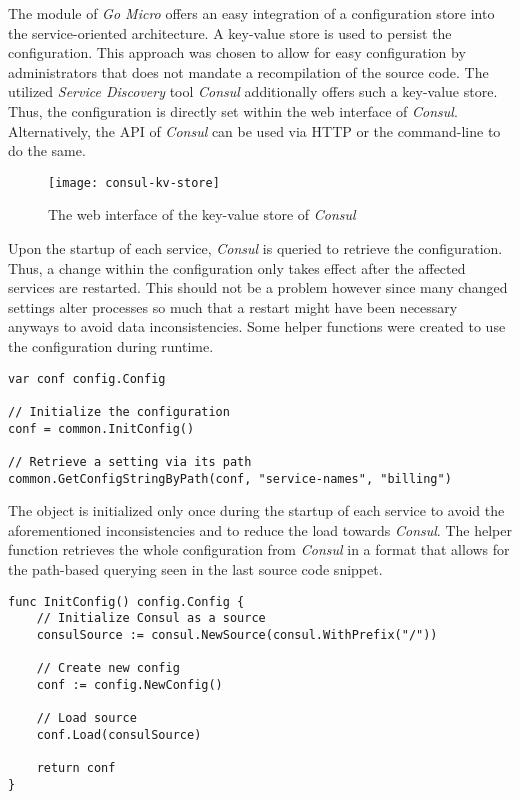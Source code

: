 \documentclass[12pt,a4paper,twoside]{report}
\begin{document}
The  module of \textit{Go Micro} offers an easy integration
of a configuration store into the service-oriented architecture.
A key-value store is used to persist the configuration.
This approach was chosen to allow for easy configuration by administrators
that does not mandate a recompilation of the source code.
The utilized \textit{Service Discovery} tool \textit{Consul} additionally offers
such a key-value store. Thus, the configuration is directly set within the
web interface of \textit{Consul}. Alternatively, the API of \textit{Consul}
can be used via HTTP or the command-line to do the same.
\begin{figure}[htbp]
\centering
\texttt{[image: consul-kv-store]}
\caption{The web interface of the key-value store of \textit{Consul}}
\label{fig:consul-kv-store}
\end{figure}
Upon the startup of each service, \textit{Consul} is queried to retrieve the
configuration. Thus, a change within the configuration only takes effect
after the affected services are restarted. This should not be a problem however
since many changed settings alter processes so much that a restart might
have been necessary anyways to avoid data inconsistencies.
Some helper functions were created to use the configuration during runtime.

\begin{lstlisting}[title=services/billing/main.go]
var conf config.Config

// Initialize the configuration
conf = common.InitConfig()

// Retrieve a setting via its path
common.GetConfigStringByPath(conf, "service-names", "billing")
\end{lstlisting}

The  object is initialized only once during the startup of each service
to avoid the aforementioned inconsistencies and to reduce the load
towards \textit{Consul}. The helper function  retrieves
the whole configuration from \textit{Consul} in a format that allows for the
path-based querying seen in the last source code snippet.

\begin{lstlisting}[title=common/config.go]
func InitConfig() config.Config {
	// Initialize Consul as a source
	consulSource := consul.NewSource(consul.WithPrefix("/"))

	// Create new config
	conf := config.NewConfig()

	// Load source
	conf.Load(consulSource)

	return conf
}
\end{lstlisting}
\end{document}
